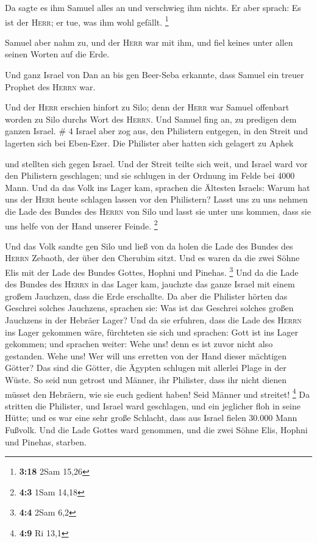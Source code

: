  Da sagte es ihm Samuel alles an und verschwieg ihm
nichts. Er aber sprach: Es ist der \textsc{Herr}; er tue, was ihm wohl
gefällt. \footnote{\textbf{3:18} 2Sam 15,26}

 Samuel aber nahm zu, und der \textsc{Herr} war mit ihm,
und fiel keines unter allen seinen Worten auf die Erde.

 Und ganz Israel von Dan an bis gen Beer-Seba erkannte,
dass Samuel ein treuer Prophet des \textsc{Herrn} war.

 Und der \textsc{Herr} erschien hinfort zu Silo; denn der
\textsc{Herr} war Samuel offenbart worden zu Silo durchs Wort des
\textsc{Herrn}. Und Samuel fing an, zu predigen dem ganzen Israel. \# 4
 Israel aber zog aus, den Philistern entgegen, in den
Streit und lagerten sich bei Eben-Ezer. Die Philister aber hatten sich
gelagert zu Aphek

 und stellten sich gegen Israel. Und der Streit teilte
sich weit, und Israel ward vor den Philistern geschlagen; und sie
schlugen in der Ordnung im Felde bei 4000 Mann.  Und da
das Volk ins Lager kam, sprachen die Ältesten Israels: Warum hat uns der
\textsc{Herr} heute schlagen lassen vor den Philistern? Lasst uns zu uns
nehmen die Lade des Bundes des \textsc{Herrn} von Silo und lasst sie
unter uns kommen, dass sie uns helfe von der Hand unserer Feinde.
\footnote{\textbf{4:3} 1Sam 14,18}

 Und das Volk sandte gen Silo und ließ von da holen die
Lade des Bundes des \textsc{Herrn} Zebaoth, der über den Cherubim sitzt.
Und es waren da die zwei Söhne Elis mit der Lade des Bundes Gottes,
Hophni und Pinehas. \footnote{\textbf{4:4} 2Sam 6,2}  Und
da die Lade des Bundes des \textsc{Herrn} in das Lager kam, jauchzte das
ganze Israel mit einem großem Jauchzen, dass die Erde erschallte.
 Da aber die Philister hörten das Geschrei solches
Jauchzens, sprachen sie: Was ist das Geschrei solches großen Jauchzens
in der Hebräer Lager? Und da sie erfuhren, dass die Lade des
\textsc{Herrn} ins Lager gekommen wäre,  fürchteten sie
sich und sprachen: Gott ist ins Lager gekommen; und sprachen weiter:
Wehe uns! denn es ist zuvor nicht also gestanden.  Wehe
uns! Wer will uns erretten von der Hand dieser mächtigen Götter? Das
sind die Götter, die Ägypten schlugen mit allerlei Plage in der Wüste.
 So seid nun getrost und Männer, ihr Philister, dass ihr
nicht dienen müsset den Hebräern, wie sie euch gedient haben! Seid
Männer und streitet! \footnote{\textbf{4:9} Ri 13,1}  Da
stritten die Philister, und Israel ward geschlagen, und ein jeglicher
floh in seine Hütte; und es war eine sehr große Schlacht, dass aus
Israel fielen 30.000 Mann Fußvolk.  Und die Lade Gottes
ward genommen, und die zwei Söhne Elis, Hophni und Pinehas, starben.

